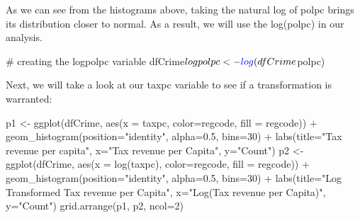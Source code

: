 \documentclass[]{article}
\newenvironment{Shaded}{}{}
\newcommand{\CommentTok}[1]{\textcolor[rgb]{0.00,0.50,0.00}{#1}}
\newcommand{\DataTypeTok}[1]{#1}
\newcommand{\DecValTok}[1]{#1}
\newcommand{\FloatTok}[1]{#1}
\newcommand{\KeywordTok}[1]{\textcolor[rgb]{0.00,0.00,1.00}{#1}}
\newcommand{\NormalTok}[1]{#1}
\newcommand{\OperatorTok}[1]{#1}
\newcommand{\StringTok}[1]{\textcolor[rgb]{0.00,0.50,0.50}{#1}}
\begin{document}
As we can see from the histograms above, taking the natural log of polpc
brings its distribution closer to normal. As a result, we will use the
log(polpc) in our analysis.

\begin{Shaded}
\begin{Highlighting}[]
\CommentTok{# creating the logpolpc variable}
\NormalTok{dfCrime}\OperatorTok{$}\NormalTok{logpolpc <-}\StringTok{ }\KeywordTok{log}\NormalTok{(dfCrime}\OperatorTok{$}\NormalTok{polpc)}
\end{Highlighting}
\end{Shaded}

Next, we will take a look at our taxpc variable to see if a
transformation is warranted:

\begin{Shaded}
\begin{Highlighting}[]
\NormalTok{p1 <-}\StringTok{ }\KeywordTok{ggplot}\NormalTok{(dfCrime, }\KeywordTok{aes}\NormalTok{(}\DataTypeTok{x =}\NormalTok{ taxpc, }\DataTypeTok{color=}\NormalTok{regcode, }\DataTypeTok{fill =}\NormalTok{ regcode)) }\OperatorTok{+}
\StringTok{  }\KeywordTok{geom_histogram}\NormalTok{(}\DataTypeTok{position=}\StringTok{"identity"}\NormalTok{, }\DataTypeTok{alpha=}\FloatTok{0.5}\NormalTok{, }\DataTypeTok{bins=}\DecValTok{30}\NormalTok{) }\OperatorTok{+}
\StringTok{  }\KeywordTok{labs}\NormalTok{(}\DataTypeTok{title=}\StringTok{"Tax revenue per capita"}\NormalTok{, }\DataTypeTok{x=}\StringTok{"Tax revenue per Capita"}\NormalTok{, }\DataTypeTok{y=}\StringTok{"Count"}\NormalTok{)}
\NormalTok{p2 <-}\StringTok{ }\KeywordTok{ggplot}\NormalTok{(dfCrime, }\KeywordTok{aes}\NormalTok{(}\DataTypeTok{x =} \KeywordTok{log}\NormalTok{(taxpc), }\DataTypeTok{color=}\NormalTok{regcode, }\DataTypeTok{fill =}\NormalTok{ regcode)) }\OperatorTok{+}
\StringTok{  }\KeywordTok{geom_histogram}\NormalTok{(}\DataTypeTok{position=}\StringTok{"identity"}\NormalTok{, }\DataTypeTok{alpha=}\FloatTok{0.5}\NormalTok{, }\DataTypeTok{bins=}\DecValTok{30}\NormalTok{) }\OperatorTok{+}
\StringTok{  }\KeywordTok{labs}\NormalTok{(}\DataTypeTok{title=}\StringTok{"Log Transformed Tax revenue per Capita"}\NormalTok{, }\DataTypeTok{x=}\StringTok{"Log(Tax revenue per Capita)"}\NormalTok{, }\DataTypeTok{y=}\StringTok{"Count"}\NormalTok{)}
\KeywordTok{grid.arrange}\NormalTok{(p1, p2, }\DataTypeTok{ncol=}\DecValTok{2}\NormalTok{)}
\end{Highlighting}
\end{Shaded}
\end{document}
